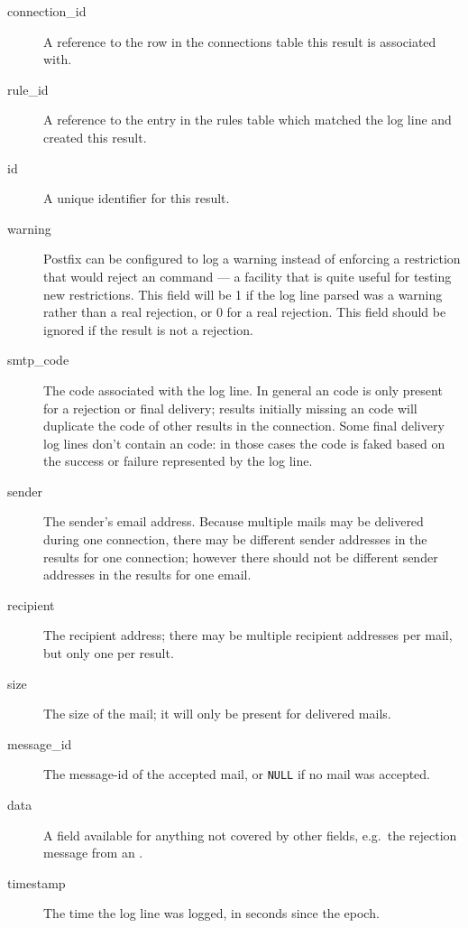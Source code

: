 \begin{description}

    \item [connection\_id] A reference to the row in the connections table
        this result is associated with.

    \item [rule\_id] A reference to the entry in the rules table which
        matched the log line and created this result.

    \item [id] A unique identifier for this result.

    \item [warning] Postfix can be configured to log a warning instead of
        enforcing a restriction that would reject an \SMTP{} command --- a
        facility that is quite useful for testing new restrictions.  This
        field will be 1 if the log line parsed was a warning rather than a
        real rejection, or 0 for a real rejection.  This field should be
        ignored if the result is not a rejection.

    \item [smtp\_code] The \SMTP{} code associated with the log line.  In
        general an \SMTP{} code is only present for a rejection or final
        delivery; results initially missing an \SMTP{} code will duplicate
        the \SMTP{} code of other results in the connection.  Some final
        delivery log lines don't contain an \SMTP{} code: in those cases
        the code is faked based on the success or failure represented by
        the log line.

    \item [sender] The sender's email address.  Because multiple mails may
        be delivered during one connection, there may be different sender
        addresses in the results for one connection; however there should
        not be different sender addresses in the results for one email.

    \item [recipient] The recipient address; there may be multiple
        recipient addresses per mail, but only one per result.

    \item [size] The size of the mail; it will only be present for
        delivered mails.

    \item [message\_id] The message-id of the accepted mail, or
        \texttt{NULL} if no mail was accepted.

    \item [data] A field available for anything not covered by other
        fields, e.g.\ the rejection message from an \RBL{}\@.

    \item [timestamp] The time the log line was logged, in seconds since
        the epoch.

\end{description}

